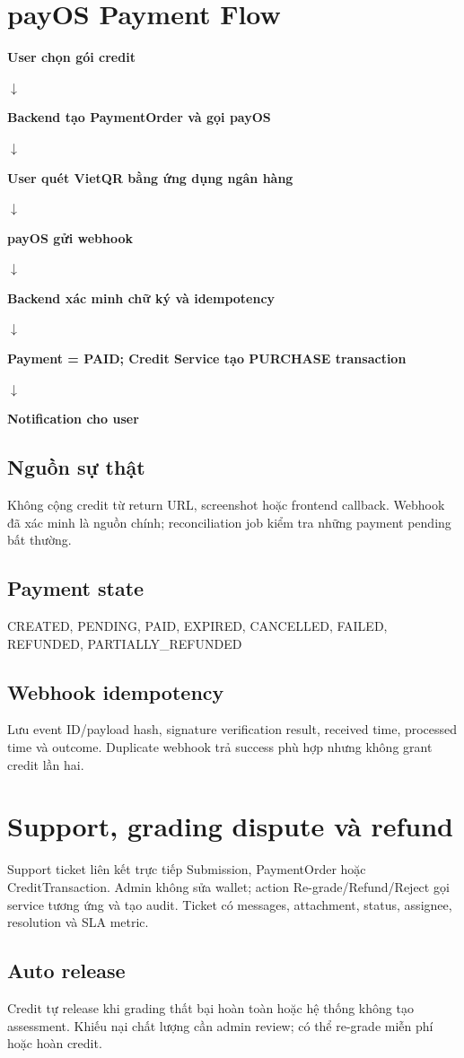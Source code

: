 \documentclass[11pt,a4paper]{article}
\newcommand{\flowarrow}{\par\centering\sffamily\color{BandBlue}\Large$\downarrow$\par}
\newcommand{\flowstep}[1]{\par\centering\sffamily\bfseries #1\par}
\begin{document}
\section{payOS Payment Flow}

\begin{flowbox}
\flowstep{User chọn gói credit}
\flowarrow
\flowstep{Backend tạo PaymentOrder và gọi payOS}
\flowarrow
\flowstep{User quét VietQR bằng ứng dụng ngân hàng}
\flowarrow
\flowstep{payOS gửi webhook}
\flowarrow
\flowstep{Backend xác minh chữ ký và idempotency}
\flowarrow
\flowstep{Payment = PAID; Credit Service tạo PURCHASE transaction}
\flowarrow
\flowstep{Notification cho user}
\end{flowbox}

\subsection{Nguồn sự thật}
Không cộng credit từ return URL, screenshot hoặc frontend callback. Webhook đã xác minh là nguồn chính; reconciliation job kiểm tra những payment pending bất thường.

\subsection{Payment state}
\begin{codebox}
CREATED, PENDING, PAID, EXPIRED, CANCELLED, FAILED, REFUNDED, PARTIALLY\_REFUNDED
\end{codebox}

\subsection{Webhook idempotency}
Lưu event ID/payload hash, signature verification result, received time, processed time và outcome. Duplicate webhook trả success phù hợp nhưng không grant credit lần hai.

\section{Support, grading dispute và refund}

Support ticket liên kết trực tiếp Submission, PaymentOrder hoặc CreditTransaction. Admin không sửa wallet; action Re-grade/Refund/Reject gọi service tương ứng và tạo audit. Ticket có messages, attachment, status, assignee, resolution và SLA metric.

\subsection{Auto release}
Credit tự release khi grading thất bại hoàn toàn hoặc hệ thống không tạo assessment. Khiếu nại chất lượng cần admin review; có thể re-grade miễn phí hoặc hoàn credit.
\end{document}

